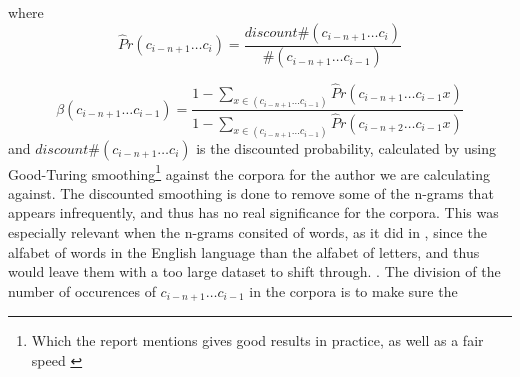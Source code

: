 where 
$$
\hat{P}r(c_{i - n + 1} \ldots c_{i}) = \frac{discount \#(c_{i - n + 1} \ldots c_{i})}{\#(c_{i - n + 1} \ldots c_{i-1})}
$$

$$
\beta(c_{i - n + 1} \ldots c_{i-1}) = 
\frac
{1 - \sum_{x \in (c_{i - n + 1} \ldots c_{i-1})}\hat{P}r(c_{i - n + 1} \ldots c_{i-1} x)}
{1 - \sum_{x \in (c_{i - n + 1} \ldots c_{i-1})}\hat{P}r(c_{i - n + 2} \ldots c_{i-1} x)}
$$
and 
$discount\#(c_{i - n + 1} \ldots c_{i})$ 
is the discounted probability, calculated by using Good-Turing smoothing\footnote{Which the report mentions gives good results in practice, as well as a fair speed \cite{nr4}} against the corpora for the author we are calculating against. The discounted smoothing is done to remove some of the n-grams that appears infrequently, and thus has no real significance for the corpora. This was especially relevant when the n-grams consited of words, as it did in \cite{nr4}, since the alfabet of words in the English language than the alfabet of letters, and thus would leave them with a too large dataset to shift through. . The division of the number of occurences of $c_{i - n + 1} \ldots c_{i - 1}$ in the corpora is to make sure the  


